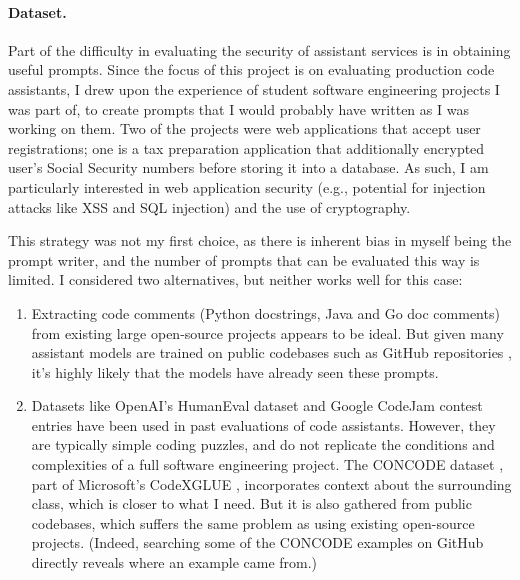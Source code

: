 \documentclass[10pt,sigplan,screen,nonacm]{acmart}
\begin{document}
\paragraph{Dataset.}
Part of the difficulty in evaluating the security of assistant services is in obtaining useful prompts. Since the focus of this project is on evaluating production code assistants, I drew upon the experience of student software engineering projects I was part of, to create prompts that I would probably have written as I was working on them. Two of the projects were web applications that accept user registrations; one is a tax preparation application that additionally encrypted user's Social Security numbers before storing it into a database. As such, I am particularly interested in web application security (e.g., potential for injection attacks like XSS and SQL injection) and the use of cryptography.

    

    
    

This strategy was not my first choice, as there is inherent bias in myself being the prompt writer, and the number of prompts that can be evaluated this way is limited. I considered two alternatives, but neither works well for this case:
\begin{enumerate}
    \item Extracting code comments (Python docstrings, Java and Go doc comments) from existing large open-source projects appears to be ideal. But given many assistant models are trained on public codebases such as Git\-Hub repositories \cite{Chen2021EvaluatingLL}, it's highly likely that the models have already seen these prompts.

    \item Datasets like Open\-AI's Human\-Eval dataset \cite{openai-humaneval} and Google Code\-Jam contest entries have been used in past evaluations of code assistants. However, they are typically simple coding puzzles, and do not replicate the conditions and complexities of a full software engineering project. The CONCODE dataset \cite{concode}, part of Microsoft's Code\-XGLUE \cite{ms-codexglue}, incorporates context about the surrounding class, which is closer to what I need. But it is also gathered from public codebases, which suffers the same problem as using existing open-source projects. (Indeed, searching some of the CONCODE examples on Git\-Hub directly reveals where an example came from.)
\end{enumerate}
\end{document}
